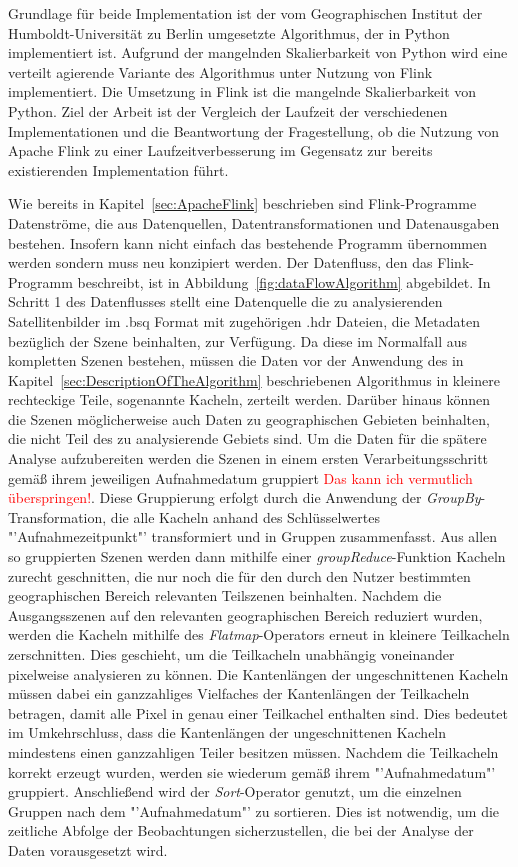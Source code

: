 Grundlage für beide Implementation ist der vom Geographischen Institut der Humboldt-Universität zu Berlin umgesetzte Algorithmus, der in Python implementiert ist. Aufgrund der mangelnden Skalierbarkeit von Python wird eine verteilt agierende Variante des Algorithmus unter Nutzung von Flink implementiert. Die Umsetzung in Flink ist die mangelnde Skalierbarkeit von Python. Ziel der Arbeit ist der Vergleich der Laufzeit der verschiedenen Implementationen und die Beantwortung der Fragestellung, ob die Nutzung von Apache Flink zu einer Laufzeitverbesserung im Gegensatz zur bereits existierenden Implementation führt.

Wie bereits in Kapitel~\ref{sec:ApacheFlink} beschrieben sind Flink-Programme Datenströme, die aus Datenquellen, Datentransformationen und Datenausgaben bestehen. Insofern kann nicht einfach das bestehende Programm übernommen werden sondern muss neu konzipiert werden. Der Datenfluss, den das Flink-Programm beschreibt, ist in Abbildung~\ref{fig:dataFlowAlgorithm} abgebildet. In Schritt 1 des Datenflusses stellt eine Datenquelle die zu analysierenden Satellitenbilder im .bsq Format mit zugehörigen .hdr Dateien, die Metadaten bezüglich der Szene beinhalten, zur Verfügung. Da diese im Normalfall aus kompletten Szenen bestehen, müssen die Daten vor der Anwendung des in Kapitel~\ref{sec:DescriptionOfTheAlgorithm} beschriebenen Algorithmus in kleinere rechteckige Teile, sogenannte Kacheln, zerteilt werden. Darüber hinaus können die Szenen möglicherweise auch Daten zu geographischen Gebieten beinhalten, die nicht Teil des zu analysierende Gebiets sind. Um die Daten für die spätere Analyse aufzubereiten werden die Szenen in einem ersten Verarbeitungsschritt gemäß ihrem jeweiligen Aufnahmedatum gruppiert \textcolor{red}{Das kann ich vermutlich überspringen!}. Diese Gruppierung erfolgt durch die Anwendung der \textit{GroupBy}-Transformation, die alle Kacheln anhand des Schlüsselwertes "'Aufnahmezeitpunkt"' transformiert und in Gruppen zusammenfasst. Aus allen so gruppierten Szenen werden dann mithilfe einer \textit{groupReduce}-Funktion Kacheln zurecht geschnitten, die nur noch die für den durch den Nutzer bestimmten geographischen Bereich relevanten Teilszenen beinhalten. Nachdem die Ausgangsszenen auf den relevanten geographischen Bereich reduziert wurden, werden die Kacheln mithilfe des \textit{Flatmap}-Operators erneut in kleinere Teilkacheln zerschnitten. Dies geschieht, um die Teilkacheln unabhängig voneinander pixelweise analysieren zu können. Die Kantenlängen der ungeschnittenen Kacheln müssen dabei ein ganzzahliges Vielfaches der Kantenlängen der Teilkacheln betragen, damit alle Pixel in genau einer Teilkachel enthalten sind. Dies bedeutet im Umkehrschluss, dass die Kantenlängen der ungeschnittenen Kacheln mindestens einen ganzzahligen Teiler besitzen müssen.  Nachdem die Teilkacheln korrekt erzeugt wurden, werden sie wiederum gemäß ihrem "'Aufnahmedatum"' gruppiert. Anschließend wird der \textit{Sort}-Operator genutzt, um die einzelnen Gruppen nach dem "'Aufnahmedatum"' zu sortieren. Dies ist notwendig, um die zeitliche Abfolge der Beobachtungen sicherzustellen, die bei der Analyse der Daten vorausgesetzt wird. 
